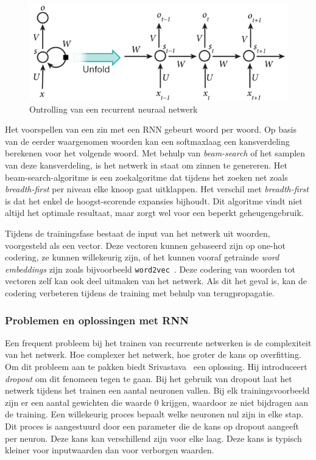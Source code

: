 \begin{figure}[tb]
    \centering
    \includegraphics[width=\linewidth]{Images/rnn.PNG}
    \caption[Ontrolling van een recurrent neuraal netwerk]{Ontrolling van een recurrent neuraal netwerk~\cite{RNNTutorial}}
    \label{fig:rnn}
\end{figure}

Het voorspellen van een zin met een RNN gebeurt woord per woord. Op basis van de eerder waargenomen woorden kan een softmaxlaag een kansverdeling berekenen voor het volgende woord. Met behulp van \emph{beam-search} of het samplen van deze kansverdeling, is het netwerk in staat om zinnen te genereren. Het beam-search-algoritme is een zoekalgoritme dat tijdens het zoeken net zoals \emph{breadth-first} per niveau elke knoop gaat uitklappen. Het verschil met \emph{breadth-first} is dat het enkel de hoogst-scorende expansies bijhoudt. Dit algoritme vindt niet altijd het optimale resultaat, maar zorgt wel voor een beperkt geheugengebruik.

Tijdens de trainingsfase bestaat de input van het netwerk uit woorden, voorgesteld als een vector. Deze vectoren kunnen gebaseerd zijn op one-hot codering, ze kunnen willekeurig zijn, of het kunnen vooraf getrainde \emph{word embeddings} zijn zoals bijvoorbeeld \texttt{word2vec}~\cite{Mikolov2013}. Deze codering van woorden tot vectoren zelf kan ook deel uitmaken van het netwerk. Als dit het geval is, kan de codering verbeteren tijdens de training met behulp van terugpropagatie.

\subsubsection{Problemen en oplossingen met RNN}
\label{subsec:solvers}
Een frequent probleem bij het trainen van recurrente netwerken is de complexiteit van het netwerk. Hoe complexer het netwerk, hoe groter de kans op overfitting. Om dit probleem aan te pakken biedt Srivastava~\cite{Srivastava2014} een oplossing. Hij introduceert \emph{dropout} om dit fenomeen tegen te gaan. Bij het gebruik van dropout laat het netwerk tijdens het trainen een aantal neuronen vallen. Bij elk trainingsvoorbeeld zijn er een aantal gewichten die waarde 0 krijgen, waardoor ze niet bijdragen aan de training. Een willekeurig proces bepaalt welke neuronen nul zijn in elke stap. Dit proces is aangestuurd door een parameter die de kans op dropout aangeeft per neuron. Deze  kans kan verschillend zijn voor elke laag. Deze kans is typisch kleiner voor inputwaarden dan voor verborgen waarden.


